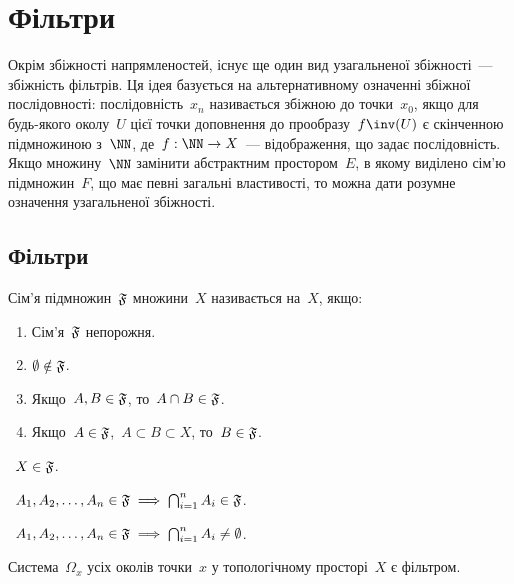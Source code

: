 \chapter{Фільтри}

Окрім збіжності напрямленостей, існує ще один вид узагальненої збіжності~--- збіжність фільтрів. Ця ідея базується на альтернативному означенні збіжної послідовності: послідовність~$x_n$ називається збіжною до точки~$x_0$, якщо для будь-якого околу~$U$ цієї точки доповнення до прообразу~$f\inv (U)$ є скінченною підмножиною з~$\NN$, де~$f: \NN \to X$~--- відображення, що задає послідовність. Якщо множину~$\NN$ замінити абстрактним простором~$E$, в якому виділено сім'ю підмножин~$F$, що має певні загальні властивості, то можна дати розумне означення узагальненої збіжності.

\section{Фільтри}

\begin{definition}
    Сім'я підмножин~$\frak F$ множини~$X$ називається  на~$X$, якщо:
    \begin{enumerate}
        \item Сім'я~$\frak F$ непорожня.
        \item $\emptyset \notin \frak F$.
        \item Якщо~$A, B \in \frak F$, то~$A \cap B \in \frak F$.
        \item Якщо~$A \in \frak F$,~$A \subset B \subset X$, то~$B \in \frak F$.
    \end{enumerate}
\end{definition}

\begin{corollary}
   ~$X \in \frak F$.
\end{corollary}

\begin{corollary}
   ~$A_1, A_2, \dots, A_n \in \frak F \implies \bigcap_{i = 1}^n A_i \in \frak F$.
\end{corollary}

\begin{corollary}
   ~$A_1, A_2, \dots, A_n \in \frak F \implies \bigcap_{i = 1}^n A_i \ne \emptyset$.
\end{corollary}

\begin{example}
    Система~$\Omega_x$ усіх околів точки~$x$ у топологічному просторі~$X$ є фільтром.
\end{example}

